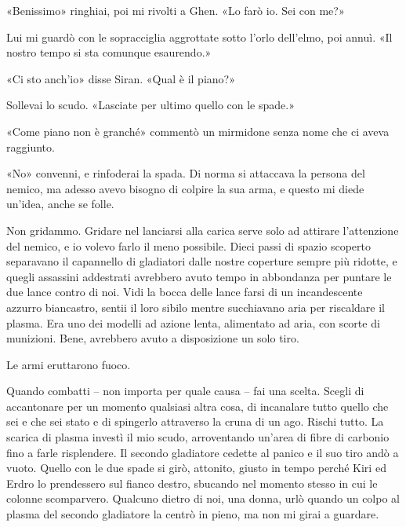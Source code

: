 «Benissimo» ringhiai, poi mi rivolti a Ghen. «Lo farò io. Sei con me?»

Lui mi guardò con le sopracciglia aggrottate sotto l'orlo dell'elmo, poi
annuì. «Il nostro tempo si sta comunque esaurendo.»

«Ci sto anch'io» disse Siran. «Qual è il piano?»

Sollevai lo scudo. «Lasciate per ultimo quello con le spade.»

«Come piano non è granché» commentò un mirmidone senza nome che ci aveva
raggiunto.

«No» convenni, e rinfoderai la spada. Di norma si attaccava la persona
del nemico, ma adesso avevo bisogno di colpire la sua arma, e questo mi
diede un'idea, anche se folle.

Non gridammo. Gridare nel lanciarsi alla carica serve solo ad attirare
l'attenzione del nemico, e io volevo farlo il meno possibile. Dieci
passi di spazio scoperto separavano il capannello di gladiatori dalle
nostre coperture sempre più ridotte, e quegli assassini addestrati
avrebbero avuto tempo in abbondanza per puntare le due lance contro di
noi. Vidi la bocca delle lance farsi di un incandescente azzurro
biancastro, sentii il loro sibilo mentre succhiavano aria per riscaldare
il plasma. Era uno dei modelli ad azione lenta, alimentato ad aria, con
scorte di munizioni. Bene, avrebbero avuto a disposizione un solo tiro.

Le armi eruttarono fuoco.

Quando combatti -- non importa per quale causa -- fai una scelta. Scegli
di accantonare per un momento qualsiasi altra cosa, di incanalare tutto
quello che sei e che sei stato e di spingerlo attraverso la cruna di un
ago. Rischi tutto. La scarica di plasma investì il mio scudo,
arroventando un'area di fibre di carbonio fino a farle risplendere. Il
secondo gladiatore cedette al panico e il suo tiro andò a vuoto. Quello
con le due spade si girò, attonito, giusto in tempo perché Kiri ed Erdro
lo prendessero sul fianco destro, sbucando nel momento stesso in cui le
colonne scomparvero. Qualcuno dietro di noi, una donna, urlò quando un
colpo al plasma del secondo gladiatore la centrò in pieno, ma non mi
girai a guardare.

